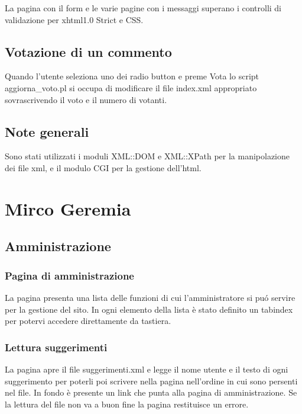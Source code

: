 \documentclass[a4paper,10pt]{article}
\begin{document}
La pagina con il form e le varie pagine con i messaggi superano i controlli di validazione per xhtml1.0 Strict e CSS.

\subsection{Votazione di un commento}

Quando l'utente seleziona uno dei radio button e preme Vota lo script aggiorna{\_}voto.pl si occupa di modificare il file index.xml appropriato sovrascrivendo il voto e il numero di votanti.

\subsection{Note generali}
Sono stati utilizzati i moduli XML::DOM e XML::XPath per la manipolazione dei file xml, e il modulo CGI per la gestione dell'html.

\section{Mirco Geremia}

\subsection{Amministrazione}

\subsubsection{Pagina di amministrazione}
La pagina presenta una lista delle funzioni di cui l'amministratore si pu\'o servire per la gestione del sito. In ogni elemento della lista \`e stato definito un tabindex per potervi accedere direttamente da tastiera. 

\subsubsection{Lettura suggerimenti}
La pagina apre il file suggerimenti.xml e legge il nome utente e il testo di ogni suggerimento per poterli poi scrivere nella pagina nell'ordine in cui sono persenti nel file. In fondo \`e presente un link che punta alla pagina di amministrazione. Se la lettura del file non va a buon fine la pagina restituisce un errore.
\end{document}
